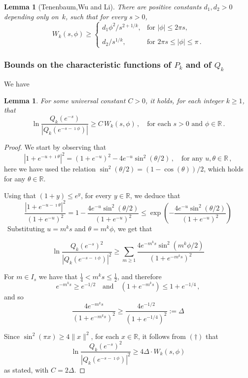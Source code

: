 \documentclass[12pt]{amsart}
\newtheorem{lemma}{Lemma}[section]
\newtheorem{lemmaL}{Lemma}
\theoremstyle{definition}
\newcommand{\R}{\mathbb{R}}
\begin{document}
\begin{lemmaL}[Tenenbaum,Wu and Li]\label{lema:estimate of W}
There are positive constants $d_1, d_2>0$ depending only on~$k$, such that for every $s>0$,
$$W_k(s,\phi)\ge \begin{cases}d_1 \phi^2/s^{2+1/k}, &\mbox{for $|\phi|\le 2 \pi s$}, \\ \\
d_2 /s^{1/k}, &\mbox{for $2\pi s\le |\phi|\le \pi$}\,.\end{cases}$$
\end{lemmaL}





\subsubsection{Bounds on the characteristic functions of $P_k$ and of $Q_k$}\label{subsubsec:bounds}

We have

\begin{lemma}\label{lem:cotas de G_k en terminos de W} For some universal constant $C>0$, it holds, for each integer $k\ge 1$, that
$$
\ln\frac{Q_k(e^{-s})}{|Q_k(e^{-s -\imath \phi})|}\ge C \, W_k(s,\phi)\, , \quad \mbox{for each $s>0$ and $\phi \in \R$}\,.
$$
\end{lemma}

\begin{proof} We start by observing that
$$ |1+e^{-u+\imath \theta}|^2=(1+e^{-u})^2-4 e^{-u} \sin^2(\theta/2)\,, \quad \mbox{for any $u, \theta\in \R$}\,,$$
here we have used the relation $\sin^2(\theta/2) = (1-\cos(\theta))/2$, which holds for any $\theta \in \R$.
\smallskip


Using that $(1+y)\le e^y$, for every $y \in \R$, we deduce that
\[
\frac{\left|1 + e^{-u - \imath\theta}\right|^2}{(1 + e^{-u})^2}
= 1 - \frac{4e^{-u}\sin^2(\theta/2)}{(1 + e^{-u})^2}
\leq \exp\!\left(-\frac{4e^{-u}\sin^2(\theta/2)}{(1 + e^{-u})^2}\right)
\]
\
Substituting $u = m^k s$ and $\theta = m^k \phi$, we get that

\begin{equation}
\tag{$\dagger$}
\ln \frac{Q_k(e^{-s})^2}{|Q_k(e^{-s - \imath\phi})|^2}
\geq \sum_{m \geq 1} \frac{4e^{-m^k s}\sin^2(m^k \phi/2)}{(1 + e^{-m^k s})^2}
\end{equation}

For $m \in I_s$ we have that $\frac{1}{4} < m^k s \leq \frac{1}{2}$, and therefore
\[
e^{-m^k s} \geq e^{-1/2}\quad \mbox{and} \quad
(1 + e^{-m^k s}) \leq 1 + e^{-1/4}\,,
\]
and so
\[
\frac{4e^{-m^k s}}{(1 + e^{-m^k s})^2}
\geq \frac{4e^{-1/2}}{(1 + e^{-1/4})^2} := \Delta
\]

Since  $\sin^2(\pi x) \geq 4\|x\|^2$, for each  $x \in \R$,
it follows from $(\dagger)$ that
\[
\ln \frac{Q_k(e^{-s})^2}{|Q_k(e^{-s - \imath \phi})|^2}
\geq 4\Delta \cdot W_k(s,\phi)
\]
as stated, with $C=2 \Delta$. \end{proof}
\end{document}
